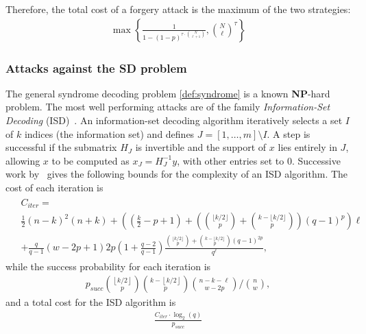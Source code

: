 \documentclass[11pt]{report}
\theoremstyle{definition}
\theoremstyle{plain}
\begin{document}
Therefore, the total cost of a forgery attack is the maximum of the two strategies:
\begin{align}
  \max \left\{ \frac{1}{1 - (1-p)^{\tau \cdot \binom{N}{\ell + 1}}}, \binom{N}{\ell}^\tau \right\}\label{eq:forgery_attack_cost}
\end{align}

\subsubsection{Attacks against the SD problem}

The general syndrome decoding problem \autoref{def:syndrome} is a known \textbf{NP}-hard problem. The most well performing attacks are of the family \textit{Information-Set Decoding} (ISD)~\cite{aguilarsyndrome11,prange1962use}. An information-set decoding algorithm iteratively selects a set $I$ of $k$ indices (the information set) and defines $J = [1, \ldots, m] \setminus I$. A step is successful if the submatrix $H_J$ is invertible and the support of $x$ lies entirely in $J$, allowing $x$ to be computed as $x_J = H_J^{-1} y$, with other entries set to $0$. Successive work by~\cite{stern1989method,peters2009information} gives the following bounds for the complexity of an ISD algorithm. The cost of each iteration is
\begin{align}
  \begin{split}
    & C_{iter} =                                                                                  \\
    & \frac{1}{2}(n-k)^2(n+k) + \left(\left(\frac{k}{2} - p + 1\right) +
    \left(\binom{\lfloor k/2 \rfloor}{p} + \binom{k - \lfloor k / 2 \rfloor}{p}\right)(q-1)^p\right) \ell \\
    & + \frac{q}{q-1}(w-2p+1) 2p \left(1 + \frac{q-2}{q-1}\right)
    \frac{\binom{\lfloor k/2 \rfloor}{p} + \binom{k - \lfloor k / 2 \rfloor}{p}(q-1)^{2p}}{q^\ell},
  \end{split}
\end{align}
while the success probability for each iteration is
\begin{align}
  p_{succ} \binom{\left\lfloor k/2 \right\rfloor }{p} \binom{k -\left\lfloor k/2 \right\rfloor }{p} \binom{n-k-\ell}{w-2p} / \binom{n}{w},
\end{align}
and a total cost for the ISD algorithm is
\begin{align}
  \frac{C_{iter} \cdot \log_2(q)}{p_{succ}}\label{eq:sd_cost}
\end{align}
\end{document}

